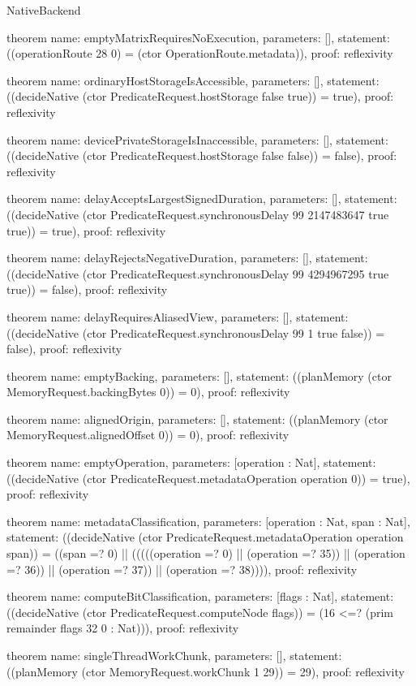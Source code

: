 \begin{lexlean}{NativeBackend}
\begin{semanticmodule}
theorem{
  name: emptyMatrixRequiresNoExecution,
  parameters: [],
  statement: ((operationRoute 28 0) = (ctor OperationRoute.metadata)),
  proof: reflexivity{}
}

theorem{
  name: ordinaryHostStorageIsAccessible,
  parameters: [],
  statement: ((decideNative (ctor PredicateRequest.hostStorage false true)) = true),
  proof: reflexivity{}
}

theorem{
  name: devicePrivateStorageIsInaccessible,
  parameters: [],
  statement: ((decideNative (ctor PredicateRequest.hostStorage false false)) = false),
  proof: reflexivity{}
}

theorem{
  name: delayAcceptsLargestSignedDuration,
  parameters: [],
  statement: ((decideNative (ctor PredicateRequest.synchronousDelay 99 2147483647 true true)) = true),
  proof: reflexivity{}
}

theorem{
  name: delayRejectsNegativeDuration,
  parameters: [],
  statement: ((decideNative (ctor PredicateRequest.synchronousDelay 99 4294967295 true true)) = false),
  proof: reflexivity{}
}

theorem{
  name: delayRequiresAliasedView,
  parameters: [],
  statement: ((decideNative (ctor PredicateRequest.synchronousDelay 99 1 true false)) = false),
  proof: reflexivity{}
}

theorem{
  name: emptyBacking,
  parameters: [],
  statement: ((planMemory (ctor MemoryRequest.backingBytes 0)) = 0),
  proof: reflexivity{}
}

theorem{
  name: alignedOrigin,
  parameters: [],
  statement: ((planMemory (ctor MemoryRequest.alignedOffset 0)) = 0),
  proof: reflexivity{}
}

theorem{
  name: emptyOperation,
  parameters: [operation : Nat],
  statement: ((decideNative (ctor PredicateRequest.metadataOperation operation 0)) = true),
  proof: reflexivity{}
}

theorem{
  name: metadataClassification,
  parameters: [operation : Nat, span : Nat],
  statement: ((decideNative (ctor PredicateRequest.metadataOperation operation span)) = ((span =? 0) || (((((operation =? 0) || (operation =? 35)) || (operation =? 36)) || (operation =? 37)) || (operation =? 38)))),
  proof: reflexivity{}
}

theorem{
  name: computeBitClassification,
  parameters: [flags : Nat],
  statement: ((decideNative (ctor PredicateRequest.computeNode flags)) = (16 <=? (prim remainder flags 32 0 : Nat))),
  proof: reflexivity{}
}

theorem{
  name: singleThreadWorkChunk,
  parameters: [],
  statement: ((planMemory (ctor MemoryRequest.workChunk 1 29)) = 29),
  proof: reflexivity{}
}


\end{semanticmodule}
\end{lexlean}
